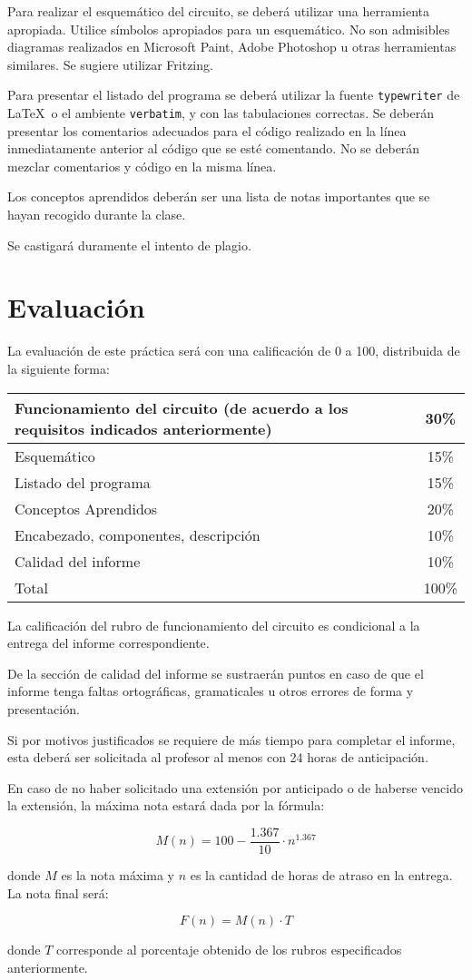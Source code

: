 \documentclass[12pt,letterpaper]{IEEEtran}
\begin{document}
Para realizar el esquemático del circuito, se deberá utilizar una herramienta apropiada. Utilice símbolos apropiados para un esquemático. No son admisibles diagramas realizados en Microsoft Paint, Adobe Photoshop u otras herramientas similares. Se sugiere utilizar Fritzing.

Para presentar el listado del programa se deberá utilizar la fuente \texttt{typewriter} de \LaTeX\ o el ambiente \texttt{verbatim}, y con las tabulaciones correctas. Se deberán presentar los comentarios adecuados para el código realizado en la línea inmediatamente anterior al código que se esté comentando. No se deberán mezclar comentarios y código en la misma línea.

Los conceptos aprendidos deberán ser una lista de notas importantes que se hayan recogido durante la clase. 

Se castigará duramente el intento de plagio.

\section{Evaluación}

La evaluación de este práctica será con una calificación de 0 a 100, distribuida de la siguiente forma:

\begin{center}
 \begin{tabular}{p{}|c}\hline
   Funcionamiento del circuito (de acuerdo a los requisitos indicados anteriormente) 					     & 30\% \\\hline
   Esquemático							& 15\% \\\hline
   Listado del programa					& 15\% \\\hline
   Conceptos Aprendidos					& 20\% \\\hline
   Encabezado, componentes, descripción & 10\% \\\hline
   Calidad del informe					& 10\% \\\hline\hline
   Total								& 100\% \\
 \end{tabular}
\end{center}

La calificación del rubro de funcionamiento del circuito es condicional a la entrega del informe correspondiente.

De la sección de calidad del informe se sustraerán puntos en caso de que el informe tenga faltas ortográficas, gramaticales u otros errores de forma y presentación.

Si por motivos justificados se requiere de más tiempo para completar el informe, esta deberá ser solicitada al profesor al menos con 24 horas de anticipación.

En caso de no haber solicitado una extensión por anticipado o de haberse vencido la extensión, la máxima nota estará dada por la fórmula:

\[ M(n) = 100-\frac{1.367}{10}\cdot n^{1.367} \]

donde $M$ es la nota máxima y $n$ es la cantidad de horas de atraso en la entrega. La nota final será:

\[ F(n) = M(n)\cdot T \]

donde $T$ corresponde al porcentaje obtenido de los rubros especificados anteriormente.
\end{document}
